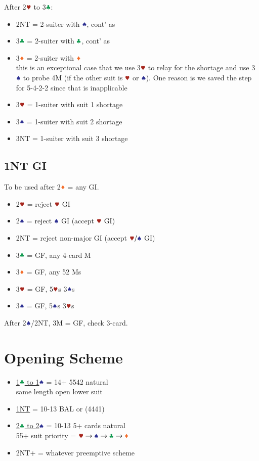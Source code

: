\documentclass{article}
\begin{document}
\begin{multicols}{2}
\begin{CJK*}{UTF8}{gt}
\noindent After 2$\hhh$ to 3$\ccc$:
\begin{itemize}
    \item 2NT = 2-suiter with $\sss$, cont' as 
    \item 3$\ccc$ = 2-suiter with $\ccc$, cont' as 
    \item 3$\ddd$ = 2-suiter with $\ddd$ \\
        this is an exceptional case that we use 3$\hhh$ to relay for the shortage and use 3$\sss$ to probe 4M (if the other suit is $\hhh$ or $\sss$). One reason is we saved the step for 5-4-2-2 since that is inapplicable
    \item 3$\hhh$ = 1-suiter with suit 1 shortage
    \item 3$\sss$ = 1-suiter with suit 2 shortage
    \item 3NT = 1-suiter with suit 3 shortage
\end{itemize}

\subsection{1NT GI}\label{sec:1n-gi}
To be used after 2$\ddd$ = any GI.

\begin{itemize}
    \item 2$\hhh$ = reject $\hhh$ GI
    \item 2$\sss$ = reject $\sss$ GI (accept $\hhh$ GI)
    \item 2NT = reject non-major GI (accept $\hhh/\sss$ GI)
    \item 3$\ccc$ = GF, any 4-card M
    \item 3$\ddd$ = GF, any 52 Ms
    \item 3$\hhh$ = GF, 5$\hhh$s 3$\sss$s
    \item 3$\sss$ = GF, 5$\sss$s 3$\hhh$s
\end{itemize}
\vspace{1em}

\noindent After 2$\sss$/2NT, 3M = GF, check 3-card.

\section{Opening Scheme}
\begin{itemize}
    \item \hyperref[sec:strong-1]{1$\ccc$ to 1$\sss$} = 14+ 5542 natural \\
    same length open lower suit
    \item \hyperref[sec:1n]{1NT} = 10-13 BAL or (4441)
    \item \hyperref[sec:intermediate-2]{2$\ccc$ to 2$\sss$} = 10-13 5+ cards natural \\
        55+ suit priority = $\hscd$
    \item 2NT+ = whatever preemptive scheme
\end{itemize}


\end{CJK*}
\end{multicols}
\end{document}
